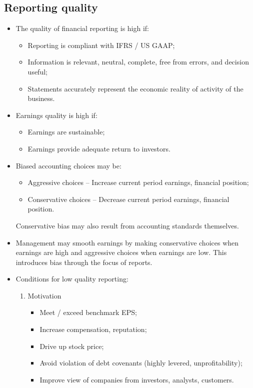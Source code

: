 \documentclass[../notes_compiled.tex]{subfiles}
\begin{document}
\subsection{Reporting quality}
\begin{itemize}

\item The quality of financial reporting is high if:
\begin{itemize}
\item Reporting is compliant with IFRS / US GAAP;
\item Information is relevant, neutral, complete, free from errors, and decision useful;
\item Statements accurately represent the economic reality of activity of the business.
\end{itemize}

\item Earnings quality is high if:
\begin{itemize}
\item Earnings are sustainable;
\item Earnings provide adequate return to investors.
\end{itemize}

\item Biased accounting choices may be:
\begin{itemize}
\item Aggressive choices -- Increase current period earnings, financial position;
\item Conservative choices -- Decrease current period earnings, financial position.
\end{itemize}
Conservative bias may also result from accounting standards themselves.

\item Management may smooth earnings by making conservative choices when earnings are high and aggressive choices when earnings are low. This introduces bias through the focus of reports.

\item Conditions for low quality reporting:
\begin{enumerate}
\item Motivation
\begin{itemize}
\item Meet / exceed benchmark EPS;
\item Increase compensation, reputation;
\item Drive up stock price;
\item Avoid violation of debt covenants (highly levered, unprofitability);
\item Improve view of companies from investors, analysts, customers.
\end{itemize}



\end{enumerate}
\end{itemize}
\end{document}

